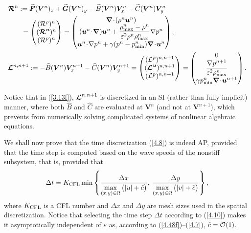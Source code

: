 \documentclass[A4paper,12pt,twoside]{article}
\numberwithin{equation}{section}
\numberwithin{figure}{section}
\numberwithin{table}{section}
\def\bnabla{\bm{\nabla}}
\newcommand{\dt}{\Delta t}
\newcommand{\dx}{\Delta x}
\newcommand{\dy}{\Delta y}
\newcommand{\mF}{\bm{F}}
\newcommand{\mG}{\bm{G}}
\newcommand{\ve}{\varepsilon}
\newcommand\eref[1]{(\ref{#1})}
\begin{document}
\begin{align}
&\begin{aligned}
\bm{{\cal R}}^n&:=\widetilde{\mF}(\bm V^n)_x+\widetilde{\mG}(\bm V^n)_y-\widetilde B(\bm V^n)\bm V_x^n-\widetilde C(\bm V^n)\bm V_y^n\\
&\hspace*{0.15cm}=\begin{pmatrix}({\cal R}^\rho)^n\\(\bm{{\cal R}}^{\bm u})^n\\({\cal R}^p)^n\end{pmatrix}=
\begin{pmatrix}\bnabla\!\cdot\!(\rho^n\bm u^n)\\(\bm u^n\!\cdot\!\bnabla)\bm u^n+\dfrac{\rho_{\max}^n-\rho^n}{\ve^2\rho^n\rho_{\max}^n}
\nabla p^n\\[1.5ex]
\bm u^n\!\cdot\!\nabla p^n+\gamma(p^n-p_{\min}^n)\bnabla\!\cdot\!\bm u^n\end{pmatrix},
\end{aligned}\label{3.12f}\\
&\bm{{\cal L}}^{n,n+1}:=-\widehat B(\bm V^n)\bm V_x^{n+1}-\widehat C(\bm V^n)\bm V_y^{n+1}=
\begin{pmatrix}({\cal L}^\rho)^{n,n+1}\\(\bm{{\cal L}}^{\bm u})^{n,n+1}\\({\cal L}^p)^{n,n+1}\end{pmatrix}
=\begin{pmatrix}0\\\dfrac{\nabla p^{n+1}}{\ve^2\rho_{\max}^n}\\[1.5ex]
\gamma p_{\min}^n\bnabla\!\cdot\!\bm u^{n+1}\end{pmatrix}.\label{3.13f}
\end{align}

Notice that in \eref{3.13f}, $\bm{{\cal L}}^{n,n+1}$ is discretized in an SI (rather than fully implicit) manner, where both $\widehat B$
and $\widehat C$ are evaluated at $\bm V^n$ (and not at $\bm V^{n+1}$), which prevents from numerically solving complicated systems of
nonlinear algebraic equations.

We shall now prove that the time discretization \eref{4.8} is indeed AP, provided that the time step is computed based on the wave speeds 
of the nonstiff subsystem, that is, provided that
\begin{equation}
\dt=K_{\rm CFL}\min\left\{\frac{\dx}{\max\limits_{(x,y)\in\Omega}\big(|u|+\tilde c\big)},\,
\frac{\dy}{\max\limits_{(x,y)\in\Omega}\big(|v|+\tilde c\big)}\right\},
\label{4.10}
\end{equation}
where $K_{\rm CFL}$ is a CFL number and $\dx$ and $\dy$ are mesh sizes used in the spatial discretization. Notice that selecting the time
step $\dt$ according to \eref{4.10} makes it asymptotically independent of $\ve$ as, according to \eref{4.48f}--\eref{4.7},
$\tilde c={\cal O}(1)$.
\end{document}
